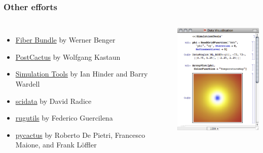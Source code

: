 \documentclass[]{beamer}
\begin{document}
\begin{frame}
  \frametitle{Other efforts}
  \begin{columns}
    \column{6cm}
  \begin{itemize}
  \item {\color{blue}\href{http://vish.fiberbundle.net/documentation/the-fiber-bundle-data-model/}{Fiber Bundle}} by Werner Benger
  \item {\color{blue}\href{https://bitbucket.org/DrWhat/pycactuset}{PostCactus}} by Wolfgang Kastaun
  \item {\color{blue}\href{http://simulationtools.org/}{Simulation Tools}} by Ian Hinder and Barry Wardell
  \item {\color{blue}\href{https://bitbucket.org/dradice/scidata}{scidata}} by David Radice
  \item {\color{blue}\href{https://bitbucket.org/fguercilena/rugutils}{rugutils}} by Federico Guercilena
  \item {\color{blue}\href{https://bitbucket.org/knarrff/pycactus}{pycactus}} by Roberto De Pietri, Francesco Maione, and Frank L\"{o}ffler
  \end{itemize}
  \column{6cm}
  \begin{center}
    \includegraphics[width=6cm]{figures/simulation_tools_example.png}
  \end{center}
  \end{columns}
\end{frame}
\end{document}
